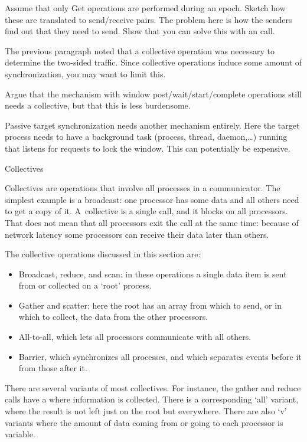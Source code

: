 \begin{exercise}
  Assume that only Get operations are performed during an epoch. 
  Sketch how these are translated to send/receive pairs. 
  The problem here is how the senders find out that they need to send.
  Show that you can solve this with an  call.
\end{exercise}

The previous paragraph noted that a collective operation was necessary
to determine the two-sided traffic. Since collective operations induce
some amount of synchronization, you may want to limit this.

\begin{exercise}
  Argue that the mechanism with window post/wait/start/complete operations
  still needs a collective, but that this is less burdensome.
\end{exercise}

Passive target synchronization needs another mechanism entirely.  Here
the target process needs to have a background task (process, thread,
daemon,\ldots) running that listens for requests to lock the
window. This can potentially be expensive.


 {Collectives}

Collectives are operations that involve all processes in a
communicator. The simplest example is a broadcast: one processor has
some data and all others need to get a copy of it.  A~collective is a
single call, and it blocks on all processors. That does not mean that
all processors exit the call at the same time: because of network
latency some processors can receive their data later than others.

The collective operations discussed in this section are:
\begin{itemize}
\item Broadcast, reduce, and scan: in these operations a single data
  item is sent from or collected on a `root' process.
\item Gather and scatter: here the root has an array from which to
  send, or in which to collect, the data from the other processors.
\item All-to-all, which lets all processors communicate with all others.
\item Barrier, which synchronizes all processes, and which separates
  events before it from those after it.
\end{itemize}
There are several variants of most collectives. For instance, the
gather and reduce calls have
a  where
information is collected.  There is a corresponding `all' variant,
where the result is not left just on the root but everywhere. 
There are also `v' variants where the
amount of data coming from or going to each processor is variable.

